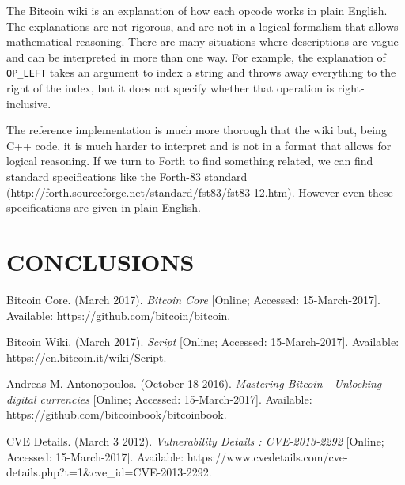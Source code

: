 \documentclass[letterpaper, 10 pt, conference]{ieeeconf}
\begin{document}
The Bitcoin wiki is an explanation of how each opcode works in plain English. The explanations are not rigorous, and are not in a logical formalism that allows mathematical reasoning. There are many situations where descriptions are vague and can be interpreted in more than one way.  For example, the explanation of \texttt{OP\_LEFT} takes an argument to index a string and throws away everything to the right of the index, but it does not specify whether that operation is right-inclusive.

The reference implementation is much more thorough that the wiki but, being C++ code, it is much harder to interpret and is not in a format that allows for logical reasoning. If we turn to Forth to find something related, we can find standard specifications like the Forth-83 standard (http://forth.sourceforge.net/standard/fst83/fst83-12.htm). However even these specifications are given in plain English.


\section{CONCLUSIONS}

\addtolength{\textheight}{-12cm}   %




\begin{thebibliography}{99}
 Bitcoin Core. (March 2017). \textit{Bitcoin Core} [Online; Accessed: 15-March-2017]. Available: https://github.com/bitcoin/bitcoin.

 Bitcoin Wiki. (March 2017). \textit{Script} [Online; Accessed: 15-March-2017]. Available: https://en.bitcoin.it/wiki/Script.

 Andreas M. Antonopoulos. (October 18 2016). \textit{Mastering Bitcoin - Unlocking digital currencies} [Online; Accessed: 15-March-2017]. Available: https://github.com/bitcoinbook/bitcoinbook.

 CVE Details. (March 3 2012). \textit{Vulnerability Details : CVE-2013-2292} [Online; Accessed: 15-March-2017]. Available: https://www.cvedetails.com/cve-details.php?t=1\&cve\_id=CVE-2013-2292.

\end{thebibliography}
\end{document}

